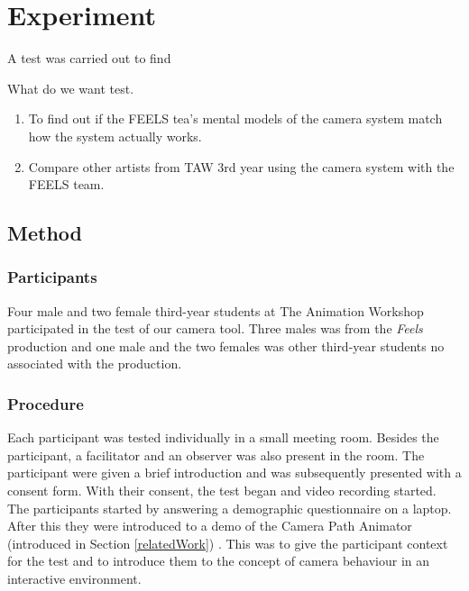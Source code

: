 \section{Experiment}


A test was carried out to find 

What do we want test.

\begin{enumerate}
\item To find out if the FEELS tea's mental models of the camera system match how the system actually works.
\item Compare other artists from TAW 3rd year using the camera system with the FEELS team.
\end{enumerate}






\subsection{Method} \label{method}

\subsubsection{Participants}
Four male and two female third-year students at The Animation Workshop participated in the test of our camera tool. Three males was from the \textit{Feels} production and one male and the two females was other third-year students no associated with the production. 

\subsubsection{Procedure}
Each participant was tested individually in a small meeting room. Besides the participant, a facilitator and an observer was also present in the room. The participant were given a brief introduction and was subsequently presented with a consent form. With their consent, the test began and video recording started. The participants started by answering a demographic questionnaire on a laptop. After this they were introduced to a demo of the Camera Path Animator (introduced in Section \ref{relatedWork}) \cite{unity_camTool}. This was to give the participant context for the test and to introduce them to the concept of camera behaviour in an interactive environment. 

